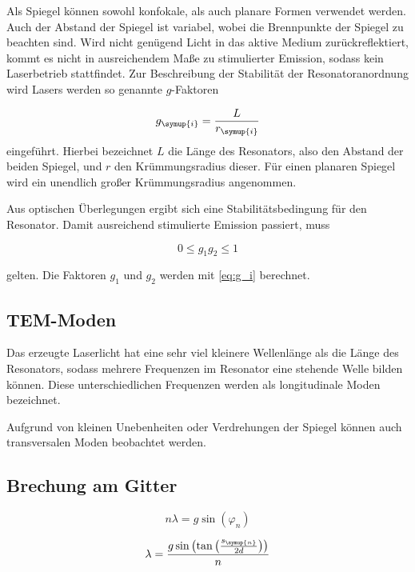 Als Spiegel können sowohl konfokale, als auch planare Formen verwendet werden. Auch der Abstand der Spiegel ist variabel, wobei die Brennpunkte der Spiegel zu beachten sind.
Wird nicht genügend Licht in das aktive Medium zurückreflektiert, kommt es nicht in ausreichendem Maße zu stimulierter Emission, sodass kein Laserbetrieb stattfindet.
Zur Beschreibung der Stabilität der Resonatoranordnung wird Lasers werden so genannte $g$-Faktoren

\begin{equation}
    g_{\symup{i}} = \frac{L}{r_{\symup{i}}}
    \label{eq:g_i}
\end{equation}
eingeführt. Hierbei bezeichnet $L$ die Länge des Resonators, also den Abstand der beiden Spiegel, und $r$ den Krümmungsradius dieser. Für einen planaren Spiegel wird ein unendlich großer
Krümmungsradius angenommen.

Aus optischen Überlegungen ergibt sich eine Stabilitätsbedingung für den Resonator. Damit ausreichend stimulierte Emission passiert, muss

\begin{equation}
    0 ≤ g_1g_2 ≤ 1
    \label{eq:g1g2}
\end{equation}

gelten. Die Faktoren $g_1$ und $g_2$ werden mit \eqref{eq:g_i} berechnet.

\subsection{TEM-Moden}
Das erzeugte Laserlicht hat eine sehr viel kleinere Wellenlänge als die Länge des Resonators, sodass mehrere Frequenzen im Resonator eine stehende Welle bilden können. Diese unterschiedlichen
Frequenzen werden als longitudinale Moden bezeichnet. 

Aufgrund von kleinen Unebenheiten oder Verdrehungen der Spiegel können auch transversalen Moden beobachtet werden.

\subsection{Brechung am Gitter}

\begin{equation}
    n \lambda = g \sin(\varphi_n)
    \label{eq:Interferenzbedingung}
\end{equation}

\begin{equation}
    \lambda = \frac{g\sin\left(\tan\left(\frac{s_{\symup{n}}}{2d}\right)\right)}{n}
    \label{eq:lambda}
\end{equation}